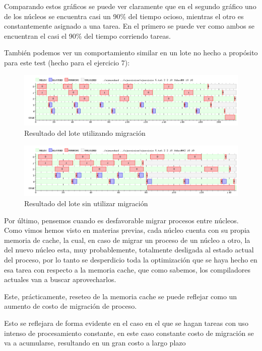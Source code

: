 \documentclass{article}
\begin{document}
Comparando estos gráficos se puede ver claramente que en el segundo gráfico uno de los núcleos se encuentra casi un 90\% del tiempo ocioso, mientras el otro es constantemente asignado a una tarea. En el primero se puede ver como ambos se encuentran el casi el 90\% del tiempo corriendo tareas. 

También podemos ver un comportamiento similar en un lote no hecho a propósito para este test (hecho para el ejercicio 7):

\begin{figure}[h!]
\caption{Resultado del lote utilizando migración \label{grf:ex8-1bm}}
\centering
\includegraphics[width=15cm]{../ejercicios/ejercicio 8-1bRR}
\end{figure}

\begin{figure}[h!]
\caption{Resultado del lote sin utilizar migración \label{grf:ex8-1b}}
\centering
\includegraphics[width=15cm]{../ejercicios/ejercicio 8-1b}
\end{figure}

Por último, pensemos cuando es desfavorable migrar procesos entre núcleos. Como vimos hemos visto en materias previas, cada núcleo cuenta con su propia memoria de cache, la cual, en caso de migrar un proceso de un núcleo a otro, la del nuevo núcleo esta, muy probablemente, totalmente desligada al estado actual del proceso, por lo tanto se desperdicio toda la optimización que se haya hecho en esa tarea con respecto a la memoria cache, que como sabemos, los compiladores actuales van a buscar aprovecharlos.\par
Este, prácticamente, reseteo de la memoria cache se puede reflejar como un aumento de costo de migración de proceso.

Esto se reflejara de forma evidente en el caso en el que se hagan tareas con uso intenso de procesamiento constante, en este caso constante costo de migración se va a acumularse, resultando en un gran costo a largo plazo
\end{document}
